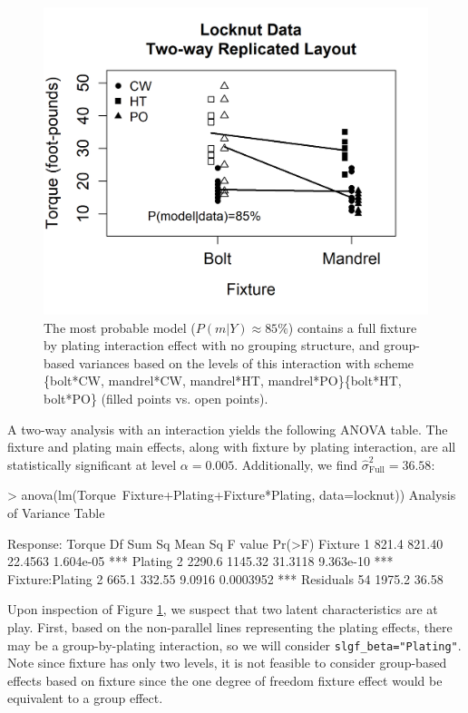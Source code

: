 \begin{figure}[htbp]
  \centering
  \includegraphics[]{figures/locknut1.png}
  \caption{The most probable model ($P(m|Y)\approx 85\%$) contains a full fixture by plating interaction effect with no grouping structure, and group-based variances based on the levels of this interaction with scheme \{bolt*CW, mandrel*CW, mandrel*HT, mandrel*PO\}\{bolt*HT, bolt*PO\} (filled points vs. open points).}
  \label{figure:locknut}
\end{figure}

A two-way analysis with an interaction yields the following ANOVA table. The fixture and plating main effects, along with fixture by plating interaction, are all statistically significant at level $\alpha=0.005$. Additionally, we find $\hat{\sigma}^2_{\text{Full}}=36.58$: 

\begin{example}
> anova(lm(Torque~Fixture+Plating+Fixture*Plating, data=locknut))  
Analysis of Variance Table  

Response: Torque
                Df Sum Sq Mean Sq F value    Pr(>F)    
Fixture          1  821.4  821.40 22.4563 1.604e-05 ***
Plating          2 2290.6 1145.32 31.3118 9.363e-10 ***
Fixture:Plating  2  665.1  332.55  9.0916 0.0003952 ***
Residuals       54 1975.2   36.58  
\end{example}

Upon inspection of Figure \ref{figure:locknut}, we suspect that two latent characteristics are at play. First, based on the non-parallel lines representing the plating effects, there may be a group-by-plating interaction, so we will consider \texttt{slgf\_beta="Plating"}. Note since fixture has only two levels, it is not feasible to consider group-based effects based on fixture since the one degree of freedom fixture effect would be equivalent to a group effect. 

